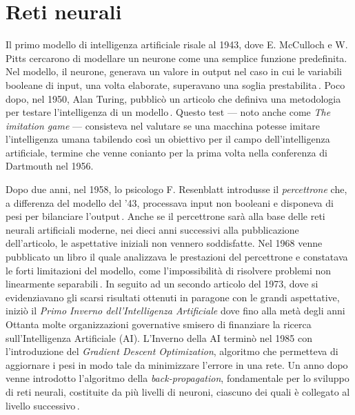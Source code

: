 
\chapter{Reti neurali}\label{chp:neural-networks}
% 
Il primo modello di intelligenza artificiale risale al 1943, dove E. McCulloch e W. Pitts cercarono di modellare un neurone come una semplice funzione predefinita. Nel modello, il neurone, generava un valore in output nel caso in cui le variabili booleane di input, una volta elaborate, superavano una soglia prestabilita\,\cite[``A logical calculus of the ideas immanent in nervous activity'']{mcculloch1943logical}. Poco dopo, nel 1950, Alan Turing, pubblicò un articolo che definiva una metodologia per testare l'intelligenza di un modello\,\cite[``Computing machinery and intelligence'']{turing2009computing}. Questo test — noto anche come \textsl{The imitation game} — consisteva nel valutare se una macchina potesse imitare l'intelligenza umana tabilendo così un obiettivo per il campo dell'intelligenza artificiale, termine che venne conianto per la prima volta nella conferenza di Dartmouth nel 1956.

Dopo due anni, nel 1958, lo psicologo F. Resenblatt introdusse il \textsl{percettrone} che, a differenza del modello del '43, processava input non booleani e disponeva di pesi per bilanciare l'output\,\cite[``The perceptron: a probabilistic model for information storage and organization in the brain.'']{rosenblatt1958perceptron}. Anche se il percettrone sarà alla base delle reti neurali artificiali moderne, nei dieci anni successivi alla pubblicazione dell'articolo, le aspettative iniziali non vennero soddisfatte. Nel 1968 venne pubblicato un libro il quale analizzava le prestazioni del percettrone e constatava le forti limitazioni del modello, come l'impossibilità di risolvere problemi non linearmente separabili\,\cite[``Perceptrons'']{minsky2017perceptrons}. In seguito ad un secondo articolo del 1973, dove si evidenziavano gli scarsi risultati ottenuti in paragone con le grandi aspettative, iniziò il \textsl{Primo Inverno dell'Intelligenza Artificiale} dove fino alla metà degli anni Ottanta molte organizzazioni governative smisero di finanziare la ricerca sull'Intelligenza Artificiale (\acs{AI}). L'Inverno della \acs{AI} terminò nel 1985 con l'introduzione del \textit{Gradient Descent Optimization}, algoritmo che permetteva di aggiornare i pesi in modo tale da minimizzare l'errore in una rete. Un anno dopo venne introdotto l'algoritmo della \textit{back-propagation}, fondamentale per lo sviluppo di reti neurali, costituite da più livelli di neuroni, ciascuno dei quali è collegato al livello successivo\,\cite[``Learning representations by back-propagating errors'']{rumelhart1986learning}.

